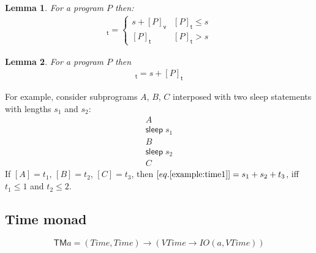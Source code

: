 \documentclass[preprint]{sigplanconf}
\newtheorem{lemma}{Lemma}
\theoremstyle{definition}
\newcommand{\sleep}{\mathsf{sleep}\;}
\newcommand{\vtime}[1]{[#1]_{\mathsf{v}}}
\newcommand{\etime}[1]{[#1]_{\mathsf{t}}}
\begin{document}
\begin{lemma}
For a program $P$ then:
\begin{align*}
\etime{P; \sleep{} s} = 
 \begin{cases}
   s + \vtime{P} & \etime{P} \leq s \\
   \etime{P} & \etime{P} > s
 \end{cases}
\end{align*}
\end{lemma}

\begin{lemma}
For a program $P$ then
\begin{align*}
\etime{\sleep{} s; P} = s + \etime{P}
\end{align*}
\end{lemma}


For example, consider subprograms $A$, $B$, $C$ interposed with two
sleep statements with lengths $s_1$ and $s_2$:
%
\begin{equation}
\begin{array}{l}
A \\
\sleep s_1 \\
B  \\
\sleep s_2 \\
C
\end{array}
\label{example:time1}
\end{equation}
If $[A] = t_1$, $[B] = t_2$, $[C] = t_3$, then $[eq. \eqref{example:time1}] = 
s_1 + s_2 + t_3$, iff $t_1 \leq 1$ and $t_2 \leq 2$.


\subsection{Time monad}

\newcommand{\TM}{\mathsf{TM}}

\begin{equation*}
\TM a = (\mathit{Time}, \mathit{Time}) \rightarrow (\mathit{VTime} \rightarrow \mathit{IO} (a, \mathit{VTime}))
\end{equation*}
\end{document}
